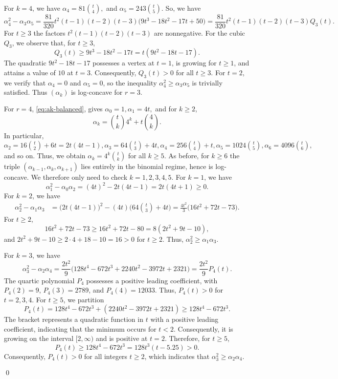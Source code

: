 \documentclass[12pt,twoside]{article}
\renewenvironment{proof}{{\noindent\bfseries Proof.}}{\qed}
\begin{document}
\begin{proof}
		For $k=4$,  we have $\alpha_4 = 81\binom{t}{4},$ and $\alpha_5 = 243\binom{t}{5}.$  
		So, we have
		\[
		\alpha_4^2 - \alpha_3\alpha_5
		= \frac{81}{320} t^2(t-1)(t-2)(t-3) 
		\bigl(9t^3 -18t^2 -17t +50\bigr)
		=\frac{81}{320} t^2(t-1)(t-2)(t-3) Q_3(t).
		\]
		For $t\ge 3$ the factors $t^2(t-1)(t-2)(t-3)$ are nonnegative. For the cubic
		$Q_3$, we observe that, for $t\ge 3$,
		\[
		Q_3(t) \ge 9t^3 -18t^2 -17t
		= t(9t^2 -18t -17).
		\]
		The quadratic $9t^2 - 18t - 17$ possesses a vertex at $t = 1$, is growing for $t \ge 1$, and attains a value of $10$ at $t = 3$. Consequently, $Q_3(t)>0$ for all $t\ge 3$. For $t=2$, we verify that $\alpha_4=0$ and $\alpha_5=0$, so the inequality $\alpha_4^2 \ge \alpha_3 \alpha_5$ is trivially satisfied. Thus $(\alpha_k)$ is log-concave for $r=3$.
		
		For $r=4$, \eqref{eq:ak-balanced}, gives  $\alpha_0=1, \alpha_1=4t,$ and for $k\ge 2$,
		\[
		\alpha_k = \binom{t}{k}4^k + t\binom{4}{k}.
		\]
		In particular,
		$ \alpha_2 = 16\binom{t}{2} + 6t = 2t(4t-1), \alpha_3 = 64\binom{t}{3} + 4t,\alpha_4 = 256\binom{t}{4} + t,	\alpha_5 = 1024\binom{t}{5},\alpha_6 = 4096\binom{t}{6},$ and so on.
		Thus, we obtain  $\alpha_k = 4^k\binom{t}{k}$ for all $k\ge 5$. As before, for $k\ge 6$ the triple $(\alpha_{k-1},\alpha_k,\alpha_{k+1})$ lies entirely in the binomial regime, hence is log-concave. We therefore only need to check	$k=1,2,3,4,5$. For $k=1$, we have
		\[
		\alpha_1^2 - \alpha_0\alpha_2 = (4t)^2 - 2t(4t-1)=2t(4t+1)  \ge  0.
		\]
		For $k=2$, we have
		\begin{align*}
			\alpha_2^2 - \alpha_1\alpha_3
			&= \bigl(2t(4t-1)\bigr)^2 - (4t)\bigl(64\binom{t}{3}+4t\bigr) = \frac{4t^2}{3}\bigl(16t^2 + 72t - 73\bigr).
		\end{align*}
		For $t\ge 2$,
		\[
		16t^2 + 72t - 73  \ge  16t^2 + 72t - 80
		= 8(2t^2 + 9t - 10),
		\]
		and $2t^2 + 9t - 10 \ge 2\cdot 4 + 18 - 10 = 16>0$ for $t\ge 2$. Thus,
		$\alpha_2^2\ge \alpha_1\alpha_3$.
		
		For $k=3$, we have
		\[
		\alpha_3^2 - \alpha_2\alpha_4
		= \frac{2t^2}{9}\bigl(128t^4 - 672t^3 + 2240t^2 - 3972t + 2321\bigr)
		= \frac{2t^2}{9}P_4(t).
		\]
		The quartic polynomial \( P_4 \) possesses a positive leading coefficient, with \( P_4(2) = 9 \), \( P_4(3) = 2789 \), and \( P_4(4) = 12033 \). Thus, $P_4(t)>0$ for $t=2, 3, 4$. For $t \ge 5$, we partition
		\[
		P_4(t) = 128t^4 - 672t^3 + (2240t^2 - 3972t + 2321)
		\ge 128t^4 - 672t^3.
		\]
		The bracket represents a quadratic function in $t$ with a positive leading coefficient, indicating that the minimum occurs for $t<2$. Consequently, it is growing on the interval $[2,\infty)$ and is positive at $t=2$. Therefore, for \( t \geq 5 \),
		\[
		P_4(t) \ge 128t^4 - 672t^3 = 128t^3(t-5.25) > 0.
		\]
		Consequently, $P_4(t)>0$ for all integers $t\ge 2$, which indicates that $\alpha_3^2\ge \alpha_2\alpha_4$.
		

\end{proof}
\end{document}
